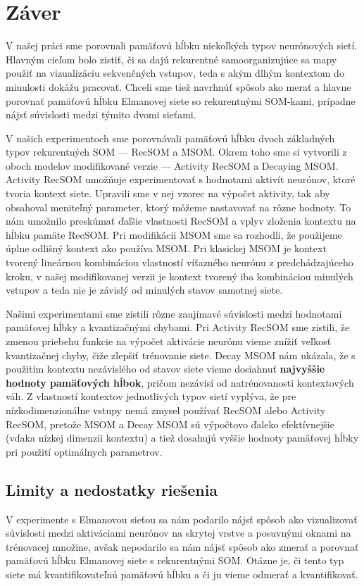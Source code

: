 \chapter*{Záver}
V našej práci sme porovnali pamäťovú hĺbku niekoľkých typov neurónových sietí.
Hlavným cieľom bolo zistiť, či sa dajú rekurentné samoorganizujúce sa mapy použiť na vizualizáciu
sekvenčných vstupov, teda s akým dlhým kontextom do minulosti dokážu pracovať. Chceli sme tiež navrhnúť 
spôsob ako merať a hlavne porovnať pamäťovú hĺbku Elmanovej siete so rekurentnými SOM-kami, prípadne 
nájsť súvislosti medzi týmito dvomi sieťami.

V našich experimentoch sme porovnávali pamäťovú hĺbku dvoch základných typov rekurentných 
SOM --- RecSOM a MSOM. Okrem toho sme si vytvorili z oboch modelov modifikované verzie --- Activity RecSOM a Decaying MSOM.
Activity RecSOM umožňuje experimentovať s hodnotami aktivít neurónov, ktoré tvoria kontext siete. Upravili sme v nej
vzorec na výpočet aktivity, tak aby obsahoval meniteľný parameter, ktorý môžeme nastavovať na rôzne hodnoty.
To nám umožnilo preskúmať ďaľšie vlastnosti RecSOM a vplyv zloženia kontextu na hĺbku pamäte RecSOM.
Pri modifikácii MSOM sme sa rozhodli, že použijeme úplne odlišný kontext ako používa MSOM. Pri klasickej MSOM
je kontext tvorený lineárnou kombináciou vlastností víťazného neurónu z predchádzajúceho kroku, v našej modifikovanej 
verzii je kontext tvorený iba kombináciou minulých vstupov a teda nie je závislý od minulých stavov samotnej siete.

Našimi experimentami sme zistili rôzne zaujímavé súvislosti medzi hodnotami pamäťovej hĺbky a kvantizačnými chybami.
Pri Activity RecSOM sme zistili, že zmenou priebehu funkcie na výpočet aktivácie neurónu vieme znížiť 
veľkosť kvantizačnej chyby, čiže zlepšiť trénovanie siete.
Decay MSOM nám ukázala, že s použitím kontextu nezávislého od stavov siete vieme dosiahnuť \textbf{najvyššie hodnoty pamäťových hĺbok}, pričom nezávisí od
natrénovanosti kontextových váh.
Z vlastností kontextov jednotlivých typov sietí vyplýva, že pre nízkodimenzionálne vstupy nemá zmysel používať RecSOM alebo Activity RecSOM, pretože 
MSOM a Decay MSOM sú výpočtovo ďaleko efektívnejšie (vďaka nízkej dimenzii kontextu) a tiež dosahujú vyššie hodnoty pamäťovej hĺbky pri použití optimálnych parametrov.


\section{Limity a nedostatky riešenia}
V experimente s Elmanovou sieťou sa nám podarilo nájsť spôsob ako vizualizovať súvislosti medzi 
aktiváciami neurónov na skrytej vrstve a posuvnými oknami na trénovacej množine, avšak 
nepodarilo sa nám nájsť spôsob ako zmerať a porovnať pamäťovú hĺbku Elmanovej siete s rekurentnými SOM.
Otázne je, či tento typ siete má kvantifikovateľnú pamäťovú hĺbku a či ju vieme odmerať a kvantifikovať.

